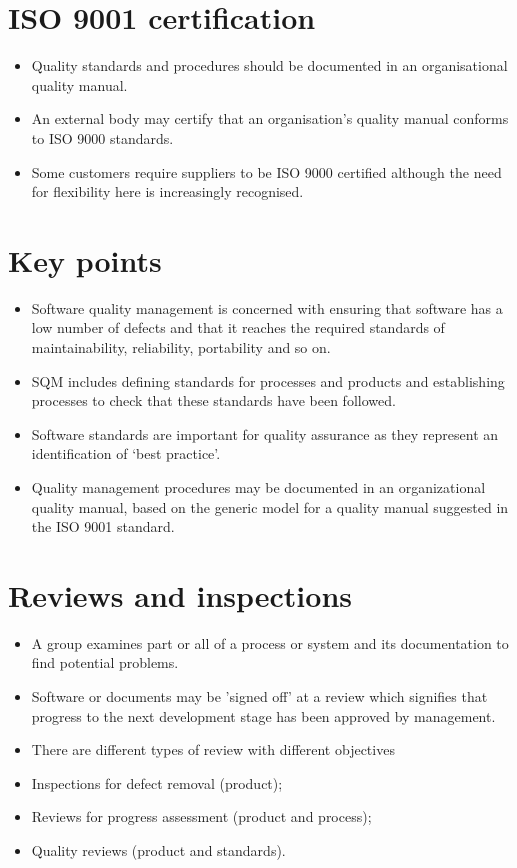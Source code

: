 \section {ISO 9001 certification}
\begin{itemize}
\item Quality standards and procedures should be documented in an organisational quality manual.
\item An external body may certify that an organisation’s quality manual conforms to ISO 9000 standards.
\item Some customers require suppliers to be ISO 9000 certified although the need for flexibility here is increasingly recognised.
\end{itemize}

\section {Key points}
\begin{itemize}
\item Software quality management is concerned with ensuring that software has a low number of defects and that it reaches the required standards of maintainability, reliability, portability and so on.

\item SQM includes defining standards for processes and products and establishing processes to check that these standards have been followed.

\item Software standards are important for quality assurance as they represent an identification of ‘best practice’.

\item Quality management procedures may be documented in an organizational quality manual, based on the generic model for a quality manual suggested in the ISO 9001 standard.
\end{itemize}
\section {Reviews and inspections}
\begin{itemize}

\item A group examines part or all of a process or system and its documentation to find potential problems.

\item Software or documents may be 'signed off' at a review which signifies that progress to the next development stage has been approved by management.

\item There are different types of review with different objectives

  \item Inspections for defect removal (product);

  \item Reviews for progress assessment (product and process);   \item Quality reviews (product and standards).
\end{itemize}
